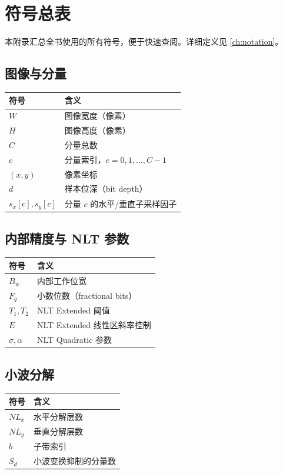 
\chapter{符号总表}\label{app:notation}

本附录汇总全书使用的所有符号，便于快速查阅。详细定义见 \cref{ch:notation}。

\section{图像与分量}

\begin{tabular}{@{}ll@{}}
\toprule
符号 & 含义 \\
\midrule
$W$ & 图像宽度（像素） \\
$H$ & 图像高度（像素） \\
$C$ & 分量总数 \\
$c$ & 分量索引，$c = 0, 1, \ldots, C-1$ \\
$(x, y)$ & 像素坐标 \\
$d$ & 样本位深（bit depth） \\
$s_x[c], s_y[c]$ & 分量 $c$ 的水平/垂直子采样因子 \\
\bottomrule
\end{tabular}

\section{内部精度与 NLT 参数}

\begin{tabular}{@{}ll@{}}
\toprule
符号 & 含义 \\
\midrule
$B_w$ & 内部工作位宽 \\
$F_q$ & 小数位数（fractional bits） \\
$T_1, T_2$ & NLT Extended 阈值 \\
$E$ & NLT Extended 线性区斜率控制 \\
$\sigma, \alpha$ & NLT Quadratic 参数 \\
\bottomrule
\end{tabular}

\section{小波分解}

\begin{tabular}{@{}ll@{}}
\toprule
符号 & 含义 \\
\midrule
$NL_x$ & 水平分解层数 \\
$NL_y$ & 垂直分解层数 \\
$b$ & 子带索引 \\
$S_d$ & 小波变换抑制的分量数 \\
\bottomrule
\end{tabular}

